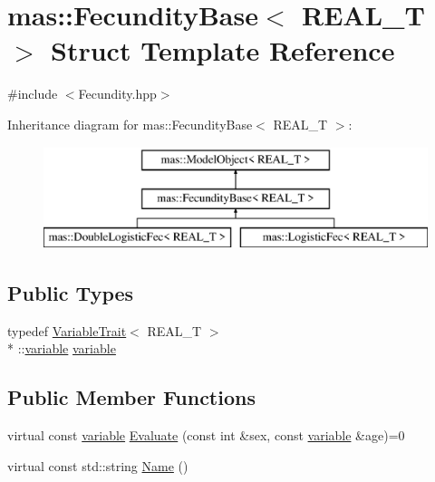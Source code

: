 \hypertarget{structmas_1_1_fecundity_base}{\section{mas\-:\-:Fecundity\-Base$<$ R\-E\-A\-L\-\_\-\-T $>$ Struct Template Reference}
\label{structmas_1_1_fecundity_base}
}


{\ttfamily \#include $<$Fecundity.\-hpp$>$}

Inheritance diagram for mas\-:\-:Fecundity\-Base$<$ R\-E\-A\-L\-\_\-\-T $>$\-:\begin{figure}[H]
\begin{center}
\leavevmode
\includegraphics[height=3.000000cm]{structmas_1_1_fecundity_base}
\end{center}
\end{figure}
\subsection*{Public Types}
\begin{DoxyCompactItemize}
\item 
typedef \hyperlink{structmas_1_1_variable_trait}{Variable\-Trait}$<$ R\-E\-A\-L\-\_\-\-T $>$\\*
\-::\hyperlink{structmas_1_1_model_object_a4e62fdbb5826f8fac311262b888ab10a}{variable} \hyperlink{structmas_1_1_fecundity_base_a3428ef488b92ccfab67d455e87e3386b}{variable}
\end{DoxyCompactItemize}
\subsection*{Public Member Functions}
\begin{DoxyCompactItemize}
\item 
virtual const \hyperlink{structmas_1_1_model_object_a4e62fdbb5826f8fac311262b888ab10a}{variable} \hyperlink{structmas_1_1_fecundity_base_a44573d4082a65920010d9d20ed2d8e14}{Evaluate} (const int \&sex, const \hyperlink{structmas_1_1_model_object_a4e62fdbb5826f8fac311262b888ab10a}{variable} \&age)=0
\item 
virtual const std\-::string \hyperlink{structmas_1_1_fecundity_base_a5a0ca3b02791910dd012a30f1c2bf2a8}{Name} ()
\end{DoxyCompactItemize}
